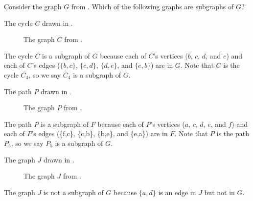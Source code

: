 \begin{exam}
\label{exam_less_obvious_subgraphs}
    Consider the graph $G$ from .  Which of the following graphs are subgraphs of $G$?
        \begin{apart}
            \item \label{part_cycle_subgraph} The cycle $C$ drawn in .
                \begin{figure}[hbtp]
                    \centering
                    
                    \caption{The graph $C$ from .}
                    \label{fig_less_obv_cycle}
                \end{figure}
                \begin{soln}
                    The cycle $C$ is a subgraph of $G$ because each of $C$'s vertices ($b$, $c$, $d$, and $e$) and each of $C$'s edges ($\{b,c\}$, $\{c,d\}$, $\{d,e\}$, and $\{e,b\}$) are in $G$.  Note that $C$ is the cycle $C_4$, so we say $C_4$ is a subgraph of $G$.
                    \end{soln}

            \item \label{part_path_subgraph}The path $P$ drawn in .
                \begin{figure}[hbtp]
                    \centering
                    
                    \caption{The graph $P$ from .}
                    \label{fig_less_obv_path}
                \end{figure}
                \begin{soln}
                    The path $P$ is a subgraph of $F$ because each of $P$'s vertices ($a$, $c$, $d$, $e$, and $f$) and each of $P$'s edges (\{f,c\}, \{c,b\}, \{b,e\}, and \{e,a\}) are in $F$. Note that $P$ is the path $P_5$, so we say $P_5$ is a subgraph of $G$.
                    \end{soln}

            \item The graph $J$ drawn in .
                \begin{figure}[hbtp]
                    \centering
                    
                    \caption{The graph $J$ from .}
                    \label{fig_less_obv_clique}
                \end{figure}
                \begin{soln}
                    The graph $J$ is not a subgraph of $G$ because $\{a,d\}$ is an edge in $J$ but not in $G$.
                \end{soln}
                    

\end{apart}
\end{exam}
